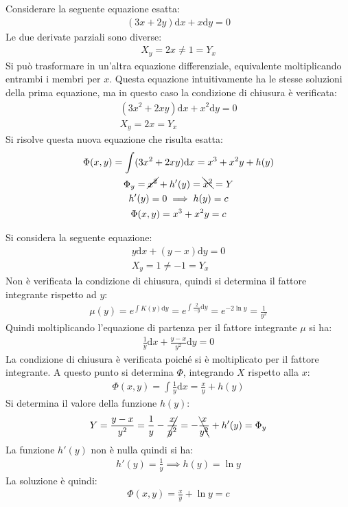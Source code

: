 \documentclass{article}
\newcommand{\df}{\mathrm{d}}
\numberwithin{equation}{subsection}
\begin{document}
Considerare la seguente equazione esatta:
\begin{gather*}
    (3x+2y)\df x+x\df y=0
\end{gather*}
Le due derivate parziali sono diverse:
\begin{gather*}
    X_y=2x\neq1=Y_x
\end{gather*}
Si può trasformare in un'altra equazione differenziale, equivalente moltiplicando entrambi i membri per $x$. Questa equazione intuitivamente ha le stesse soluzioni della prima equazione, ma in questo caso la condizione di chiusura è verificata:
\begin{gather*}
    (3x^2+2xy)\df x+x^2\df y=0\\
    X_y=2x=Y_x
\end{gather*}
Si risolve questa nuova equazione che risulta esatta:
\begin{gather*}
    \Phi(x,y)=\int (3x^2+2xy)\df x=x^3+x^2y+h(y)\\
    \Phi_y=\cancel{x^2}+h'(y)=\bcancel{x^2}=Y\\
    h'(y)=0\implies h(y)=c\\
    \Phi(x,y)=x^3+x^2y=c
\end{gather*}



Si considera la seguente equazione:
\begin{gather*}
    y\df x+(y-x)\df y=0\\
    X_y=1\neq-1=Y_x
\end{gather*}
Non è verificata la condizione di chiusura, quindi si determina il fattore integrante rispetto ad $y$:
\begin{gather*}
    \mu(y)=e^{\int K(y)\df y}=e^{\int\frac{2}{-y}\df y}=e^{-2\ln y}=\frac{1}{y^2}
\end{gather*}
Quindi moltiplicando l'equazione di partenza per il fattore integrante $\mu$ si ha:
\begin{gather*}
    \frac{1}{y}\df x+\frac{y-x}{y^2}\df y=0
\end{gather*}
La condizione di chiusura è verificata poiché si è moltiplicato per il fattore integrante. A questo punto si determina $\Phi$, integrando $X$ rispetto alla $x$:
\begin{gather*}
    \Phi(x,y)=\int\frac{1}{y}\df x=\frac{x}{y}+h(y)
\end{gather*}
Si determina il valore della funzione $h(y)$:
\begin{gather*}
    Y=\frac{y-x}{y^2}=\frac{1}{y}-\cancel{\frac{x}{y^2}}=-\bcancel{\frac{x}{y^2}}+h'(y)=\Phi_y
\end{gather*}
La funzione $h'(y)$ non è nulla quindi si ha:
\begin{gather*}
    h'(y)=\frac{1}{y}\implies h(y)=\ln y
\end{gather*}
La soluzione è quindi:
\begin{gather*}
    \Phi(x,y)=\frac{x}{y}+\ln y=c
\end{gather*}
\end{document}
